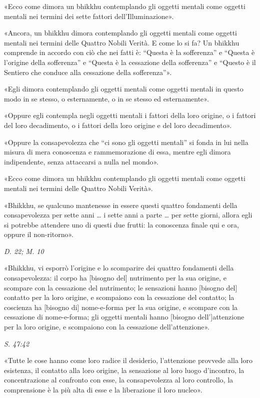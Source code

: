 «Ecco come dimora un bhikkhu contemplando gli oggetti mentali come
oggetti mentali nei termini dei sette fattori dell’Illuminazione».


«Ancora, un bhikkhu dimora contemplando gli oggetti mentali come oggetti
mentali nei termini delle Quattro Nobili Verità. E come lo si fa? Un
bhikkhu comprende in accordo con ciò che nei fatti è: “Questa è la
sofferenza” e “Questa è l’origine della sofferenza” e “Questa è la
cessazione della sofferenza” e “Questo è il Sentiero che conduce alla
cessazione della sofferenza”».


«Egli dimora contemplando gli oggetti mentali come oggetti mentali in
questo modo in se stesso, o esternamente, o in se stesso ed
esternamente».


«Oppure egli contempla negli oggetti mentali i fattori della loro
origine, o i fattori del loro decadimento, o i fattori della loro
origine e del loro decadimento».


«Oppure la consapevolezza che “ci sono gli oggetti mentali” si fonda in
lui nella misura di mera conoscenza e rammemorazione di essa, mentre
egli dimora indipendente, senza attaccarsi a nulla nel mondo».


«Ecco come dimora un bhikkhu contemplando gli oggetti mentali come
oggetti mentali nei termini delle Quattro Nobili Verità».


«Bhikkhu, se qualcuno mantenesse in essere questi quattro fondamenti
della consapevolezza per sette anni … i sette anni a parte … per sette
giorni, allora egli si potrebbe attendere uno di questi due frutti: la
conoscenza finale qui e ora, oppure il non-ritorno».


\emph{D. 22; M. 10}


«Bhikkhu, vi esporrò l’origine e lo scomparire dei quattro fondamenti
della consapevolezza: il corpo ha [bisogno del] nutrimento per la sua
origine, e scompare con la cessazione del nutrimento; le sensazioni
hanno [bisogno del] contatto per la loro origine, e scompaiono con la
cessazione del contatto; la coscienza ha [bisogno di] nome-e-forma per
la sua origine, e scompare con la cessazione di nome-e-forma; gli
oggetti mentali hanno [bisogno dell’]attenzione per la loro origine, e
scompaiono con la cessazione dell’attenzione».


\emph{S. 47:42}


«Tutte le cose hanno come loro radice il desiderio, l’attenzione
provvede alla loro esistenza, il contatto alla loro origine, la
sensazione al loro luogo d’incontro, la concentrazione al confronto con
esse, la consapevolezza al loro controllo, la comprensione è la più alta
di esse e la liberazione il loro nucleo».


